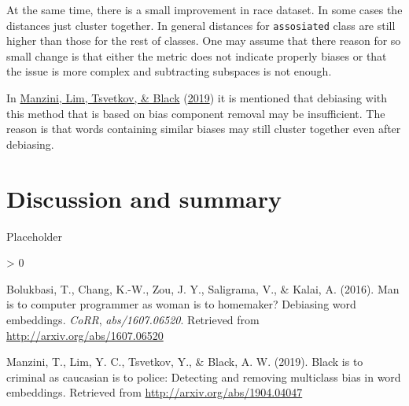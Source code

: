 \documentclass[
  12pt,
]{book}
\newlength{\cslhangindent}
\newenvironment{CSLReferences}[2] %
 {%
  \setlength{\parindent}{0pt}
  \ifodd #1 \everypar{\setlength{\hangindent}{\cslhangindent}}\ignorespaces\fi
  \ifnum #2 > 0
  \setlength{\parskip}{#2\baselineskip}
  \fi
 }%
 {}
\begin{document}
At the same time, there is a small improvement in race dataset. In some cases the distances just cluster together. In general distances for \texttt{assosiated} class are still higher than those for the rest of classes. One may assume that there reason for so small change is that either the metric does not indicate properly biases or that the issue is more complex and subtracting subspaces is not enough.

In \protect\hyperlink{ref-Manzini2019blackToCriminal}{Manzini, Lim, Tsvetkov, \& Black} (\protect\hyperlink{ref-Manzini2019blackToCriminal}{2019}) it is mentioned that debiasing with this method that is based on bias component removal may be insufficient. The reason is that words containing similar biases may still cluster together even after debiasing.

\hypertarget{discussion-and-summary}{%
\chapter{Discussion and summary}\label{discussion-and-summary}}

Placeholder

\hypertarget{refs}{}
\begin{CSLReferences}{1}{0}
\leavevmode\hypertarget{ref-Bolukbasi2016Man}{}%
Bolukbasi, T., Chang, K.-W., Zou, J. Y., Saligrama, V., \& Kalai, A. (2016). Man is to computer programmer as woman is to homemaker? Debiasing word embeddings. \emph{CoRR}, \emph{abs/1607.06520}. Retrieved from \url{http://arxiv.org/abs/1607.06520}

\leavevmode\hypertarget{ref-Manzini2019blackToCriminal}{}%
Manzini, T., Lim, Y. C., Tsvetkov, Y., \& Black, A. W. (2019). Black is to criminal as caucasian is to police: Detecting and removing multiclass bias in word embeddings. Retrieved from \url{http://arxiv.org/abs/1904.04047}

\end{CSLReferences}
\end{document}
